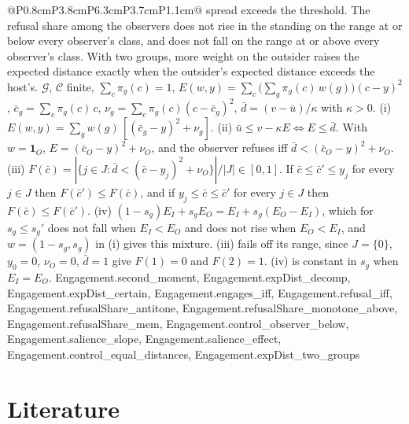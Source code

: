 \begin{longtable}{@{}P{0.8cm}P{3.8cm}P{6.3cm}P{3.7cm}P{1.1cm}@{}}
{  spread exceeds the threshold. The refusal share among the observers does
  not rise in the standing on the range at or below every observer's class,
  and does not fall on the range at or above every observer's class. With
  two groups, more weight on the outsider raises the expected distance
  exactly when the outsider's expected distance exceeds the host's.}
  {$\mathcal{G}$, $\mathcal{C}$ finite, $\sum_c\pi_g(c)=1$,
  $E(w,y)=\sum_c\big(\sum_g\pi_g(c)\,w(g)\big)(c-y)^2$,
  $\bar c_g=\sum_c\pi_g(c)\,c$, $\nu_g=\sum_c\pi_g(c)(c-\bar c_g)^2$,
  $\bar d=(v-\bar u)/\kappa$ with $\kappa>0$.
  (i) $E(w,y)=\sum_g w(g)\,[(\bar c_g-y)^2+\nu_g]$.
  (ii) $\bar u\le v-\kappa E\iff E\le\bar d$. With $w=\mathbf 1_O$,
  $E=(\bar c_O-y)^2+\nu_O$, and the observer refuses iff
  $\bar d<(\bar c_O-y)^2+\nu_O$.
  (iii) $F(\bar c)=|\{j\in J:\bar d<(\bar c-y_j)^2+\nu_O\}|/|J|\in[0,1]$.
  If $\bar c\le\bar c'\le y_j$ for every $j\in J$ then $F(\bar c')\le F(\bar c)$,
  and if $y_j\le\bar c\le\bar c'$ for every $j\in J$ then $F(\bar c)\le F(\bar c')$.
  (iv) $(1-s_g)E_I+s_gE_O=E_I+s_g(E_O-E_I)$, which for $s_g\le s_g'$ does not
  fall when $E_I<E_O$ and does not rise when $E_O<E_I$, and $w=(1-s_g,s_g)$
  in (i) gives this mixture.
  (iii) fails off its range, since $J=\{0\}$, $y_0=0$, $\nu_O=0$, $\bar d=1$
  give $F(1)=0$ and $F(2)=1$. (iv) is constant in $s_g$ when $E_I=E_O$.}
  {Engagement.second_moment, Engagement.expDist_decomp, Engagement.expDist_certain, Engagement.engages_iff, Engagement.refusal_iff, Engagement.refusalShare_antitone, Engagement.refusalShare_monotone_above, Engagement.refusalShare_mem, Engagement.control_observer_below, Engagement.salience_slope, Engagement.salience_effect, Engagement.control_equal_distances, Engagement.expDist_two_groups}
\end{longtable}
\normalsize

\section{Literature}

